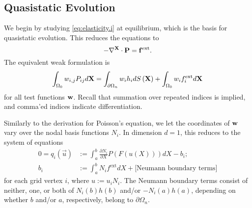 \subsection{Quasistatic Evolution}

We begin by studying \eqref{eq:elasticity.i} at equilibrium, which is the basis for quasistatic evolution. This reduces the equations to
\begin{equation}\label{eq:elasticity.quasistatic}
-\nabla^{\mathbf{X}} \cdot \mathbf{P} = \mathbf{f}^{\text{ext}}.
\end{equation}
The equivalent weak formulation is
\begin{equation*}
\int_{\Omega_0} w_{i,j} P_{ij} d\mathbf{X} = \int_{\partial \Omega_n} w_i h_i dS \left( \mathbf{X} \right) + \int_{\Omega_0} w_i f_i^{\text{ext}} d\mathbf{X}
\end{equation*}
for all test functions $\mathbf{w}$. Recall that summation over repeated indices is implied, and comma'ed indices indicate differentiation.

Similarly to the derivation for Poisson's equation, we let the coordinates of $\mathbf{w}$ vary over the nodal basis functions $N_i$. In dimension $d = 1$, this reduces to the system of equations
\begin{subequations}\label{eq:elasticity.quasistatic.weak.1d}
\begin{align}
0 = q_i \left( \vec{u} \right) & := \int_a^b \frac{\partial N_i}{\partial X} P(F(u(X))) dX - b_i; \label{eq:elasticity.quasistatic.weak.1d.qi} \\
b_i & := \int_a^b N_i f^{\text{ext}} dX + \text{[Neumann boundary terms]} \label{eq:elasticity.quasistatic.weak.1d.bi}
\end{align}
\end{subequations}
for each grid vertex $i$, where $u := u_i N_i$. The Neumann boundary terms consist of neither, one, or both of $N_i(b) h(b)$ and/or $-N_i(a) h(a)$, depending on whether $b$ and/or $a$, respectively, belong to $\partial\Omega_n$.

